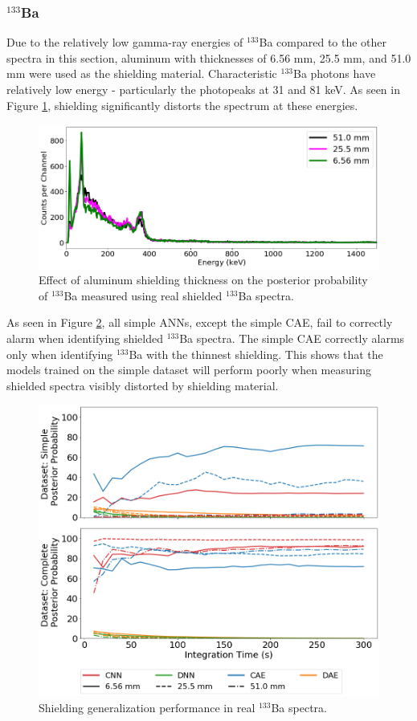 \subsubsection{$^{133}$Ba}

Due to the relatively low gamma-ray energies of $^{133}$Ba compared to the other spectra in this section, aluminum with thicknesses of 6.56 mm, 25.5 mm, and 51.0 mm were used as the shielding material. Characteristic $^{133}$Ba photons have relatively low energy - particularly the photopeaks at 31 and 81 keV. As seen in Figure \ref{fig:shielded_ba133}, shielding significantly distorts the spectrum at these energies.

\begin{figure}[H]
	\centering
	\includegraphics[width=0.8\linewidth]{images/shielded_ba133}
	\caption{Effect of aluminum shielding thickness on the posterior probability of $^{133}$Ba measured using real shielded $^{133}$Ba spectra.}
	\label{fig:shielded_ba133}
\end{figure}

As seen in Figure \ref{fig:alum_ba133}, all simple ANNs, except the simple CAE, fail to correctly alarm when identifying shielded $^{133}$Ba spectra. The simple CAE correctly alarms only when identifying $^{133}$Ba with the thinnest shielding. This shows that the models trained on the simple dataset will perform poorly when measuring shielded spectra visibly distorted by shielding material.

\begin{figure}[H]
	\centering
	\includegraphics[width=0.8\linewidth]{images/alum_ba133}	\caption{Shielding generalization performance in real $^{133}$Ba spectra.}
	\label{fig:alum_ba133}
\end{figure}

